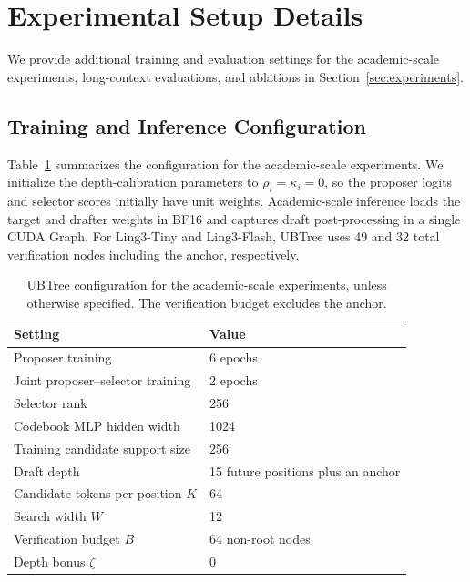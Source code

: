 \section{Experimental Setup Details}
\label{app:experimental-setup}

We provide additional training and evaluation settings for the academic-scale experiments, long-context evaluations, and ablations in Section~\ref{sec:experiments}.

\subsection{Training and Inference Configuration}
\label{app:training-configuration}

Table~\ref{tab:ubtree-configuration} summarizes the configuration for the academic-scale experiments. We initialize the depth-calibration parameters to $\rho_i=\kappa_i=0$, so the proposer logits and selector scores initially have unit weights. Academic-scale inference loads the target and drafter weights in BF16 and captures draft post-processing in a single CUDA Graph. For Ling3-Tiny and Ling3-Flash, UBTree uses 49 and 32 total verification nodes including the anchor, respectively.

\begin{table}[t]
\centering
\caption{UBTree configuration for the academic-scale experiments, unless otherwise specified. The verification budget excludes the anchor.}
\label{tab:ubtree-configuration}
\begin{tabular}{ll}
\toprule
Setting & Value \\
\midrule
Proposer training & 6 epochs \\
Joint proposer--selector training & 2 epochs \\
Selector rank & 256 \\
Codebook MLP hidden width & 1024 \\
Training candidate support size & 256 \\
\midrule
Draft depth & 15 future positions plus an anchor \\
Candidate tokens per position $K$ & 64 \\
Search width $W$ & 12 \\
Verification budget $B$ & 64 non-root nodes \\
Depth bonus $\zeta$ & $0$ \\
\bottomrule
\end{tabular}
\end{table}

